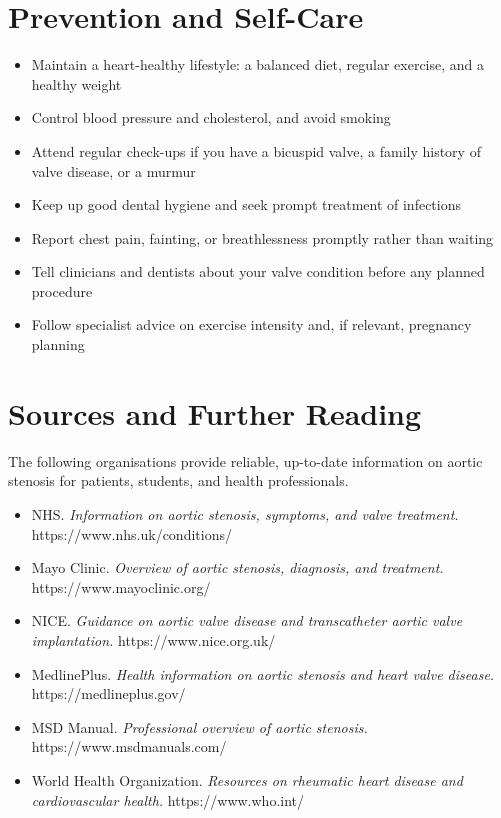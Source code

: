 \section*{Prevention and Self-Care}
\begin{itemize}
    \item Maintain a heart-healthy lifestyle: a balanced diet, regular exercise, and a healthy weight
    \item Control blood pressure and cholesterol, and avoid smoking
    \item Attend regular check-ups if you have a bicuspid valve, a family history of valve disease, or a murmur
    \item Keep up good dental hygiene and seek prompt treatment of infections
    \item Report chest pain, fainting, or breathlessness promptly rather than waiting
    \item Tell clinicians and dentists about your valve condition before any planned procedure
    \item Follow specialist advice on exercise intensity and, if relevant, pregnancy planning
\end{itemize}

\section*{Sources and Further Reading}
The following organisations provide reliable, up-to-date information on aortic stenosis for patients, students, and health professionals.

\begin{itemize}
    \item NHS. \textit{Information on aortic stenosis, symptoms, and valve treatment.} https://www.nhs.uk/conditions/
    \item Mayo Clinic. \textit{Overview of aortic stenosis, diagnosis, and treatment.} https://www.mayoclinic.org/
    \item NICE. \textit{Guidance on aortic valve disease and transcatheter aortic valve implantation.} https://www.nice.org.uk/
    \item MedlinePlus. \textit{Health information on aortic stenosis and heart valve disease.} https://medlineplus.gov/
    \item MSD Manual. \textit{Professional overview of aortic stenosis.} https://www.msdmanuals.com/
    \item World Health Organization. \textit{Resources on rheumatic heart disease and cardiovascular health.} https://www.who.int/
\end{itemize}
